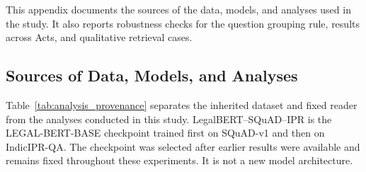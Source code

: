 \documentclass[pdflatex,sn-basic]{sn-jnl}%
\theoremstyle{thmstyleone}%
\theoremstyle{thmstyletwo}%
\theoremstyle{thmstylethree}%
\newcommand{\fixedreader}{LegalBERT--SQuAD--IPR}
\begin{document}
This appendix documents the sources of the data, models, and analyses used in
the study. It also reports robustness checks for the question grouping rule,
results across Acts, and qualitative retrieval cases.

\subsection{Sources of Data, Models, and Analyses}

Table~\ref{tab:analysis_provenance} separates the inherited dataset and fixed
reader from the analyses conducted in this study. \fixedreader{} is the
LEGAL-BERT-BASE checkpoint trained first on SQuAD-v1 and then on IndicIPR-QA.
The checkpoint was selected after earlier results were available and remains
fixed throughout these experiments. It is not a new model architecture.
\end{document}
